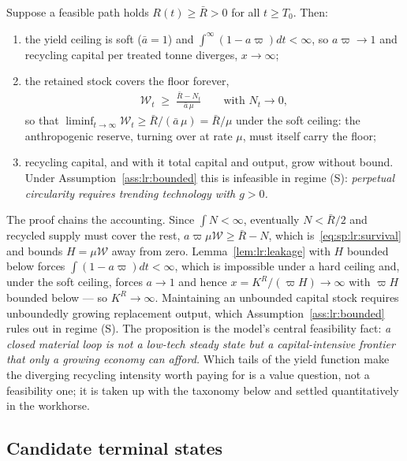 \begin{proposition}\label{prop:lr:growth}
Suppose a feasible path holds $R\left(t\right)\ge\bar R>0$ for all $t\ge T_0$. Then:
\begin{enumerate}
\item the yield ceiling is soft ($\bar a=1$) and $\int^\infty\left(1-a\varpi\right)dt<\infty$, so $a\varpi\to1$ and recycling capital per treated tonne diverges, $x\to\infty$;
\item the retained stock covers the floor forever,
\begin{align}
\mathcal W_t \;\ge\; \frac{\bar R-N_t}{\bar a\,\mu}
\qquad\text{with }N_t\to0,
\label{eq:sp:lr:survival}
\end{align}
so that $\liminf_{t\to\infty}\mathcal W_t\ge\bar R/\left(\bar a\,\mu\right)=\bar R/\mu$ under the soft ceiling: the anthropogenic reserve, turning over at rate $\mu$, must itself carry the floor;
\item recycling capital, and with it total capital and output, grow without bound. Under Assumption~\ref{ass:lr:bounded} this is infeasible in regime (S): \emph{perpetual circularity requires trending technology with $g>0$.}
\end{enumerate}
\end{proposition}

The proof chains the accounting. Since $\int N<\infty$, eventually $N<\bar R/2$ and recycled supply must cover the rest, $a\varpi\mu\mathcal W\ge\bar R-N$, which is~\eqref{eq:sp:lr:survival} and bounds $H=\mu\mathcal W$ away from zero. Lemma~\ref{lem:lr:leakage} with $H$ bounded below forces $\int\left(1-a\varpi\right)dt<\infty$, which is impossible under a hard ceiling and, under the soft ceiling, forces $a\to1$ and hence $x=K^R/\left(\varpi H\right)\to\infty$ with $\varpi H$ bounded below --- so $K^R\to\infty$. Maintaining an unbounded capital stock requires unboundedly growing replacement output, which Assumption~\ref{ass:lr:bounded} rules out in regime (S). The proposition is the model's central feasibility fact: \emph{a closed material loop is not a low-tech steady state but a capital-intensive frontier that only a growing economy can afford.} Which tails of the yield function make the diverging recycling intensity worth paying for is a value question, not a feasibility one; it is taken up with the taxonomy below and settled quantitatively in the workhorse.

\subsection{Candidate terminal states}\label{sec:sp:longrun:class}

